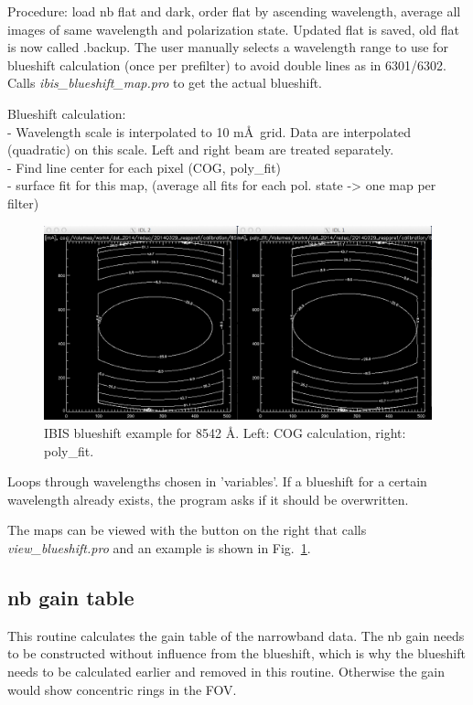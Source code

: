 \documentclass[a4paper,12pt]{article}
\begin{document}
Procedure: load nb flat and dark, order flat by ascending wavelength, average all images of same wavelength and polarization state. Updated flat is saved, old flat is now called .backup. The user manually selects a wavelength range to use for blueshift calculation (once per prefilter) to avoid double lines as in 6301/6302. Calls \textit{ibis\_blueshift\_map.pro} to get the actual blueshift.

Blueshift calculation:\\
- Wavelength scale is interpolated to 10 m\AA\ grid. Data are interpolated (quadratic) on this scale. Left and right beam are treated separately.\\
 - Find line center for each pixel (COG, poly\_fit)\\
-  surface fit for this map, (average all fits for each pol. state -> one map per filter)\\

\begin{figure}[!htb]
\begin{centering}
\includegraphics[width=.9\textwidth]{ibisblueshift.png}
\caption{IBIS blueshift example for 8542 \AA. Left: COG calculation, right: poly\_fit. \label{figbs}}
\end{centering}
\end{figure}

 
Loops through wavelengths chosen in 'variables'. If a blueshift for a certain wavelength already exists, the program asks if it should be overwritten.

The maps can be viewed with the button on the right that calls \textit{view\_blueshift.pro} and an example is shown in Fig.~\ref{figbs}. 

\subsection{nb gain table}
This routine calculates the gain table of the narrowband data. The nb gain needs to be constructed without influence from the blueshift, which is why the blueshift needs to be calculated earlier and removed in this routine. Otherwise the gain would show concentric rings in the FOV.
\end{document}
